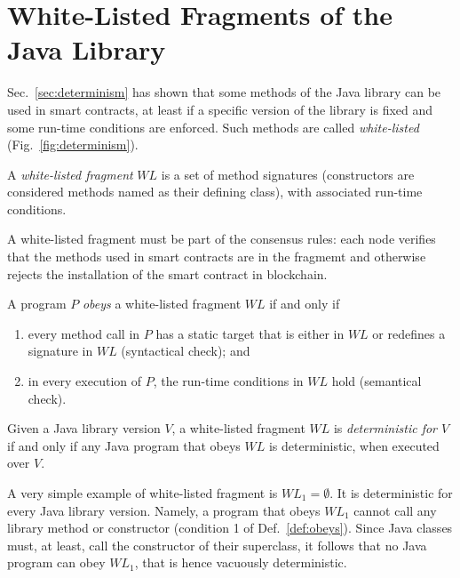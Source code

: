 \section{White-Listed Fragments of the Java Library}\label{sec:white_listing}

\newcommand{\wl}{\mathit{WL}}

Sec.~\ref{sec:determinism} has shown that some methods of the Java library can be used
in smart contracts, at least if a specific version of the library is fixed and some
run-time conditions are enforced. Such methods are called \emph{white-listed}
(Fig.~\ref{fig:determinism}).

\begin{definition}\label{def:white-listing}
  A \emph{white-listed fragment} $\wl$ is a set of method signatures (constructors are considered
  methods named as their defining class), with associated run-time conditions.
\end{definition}
%
A white-listed fragment must be part of the
consensus rules: each node verifies that the methods used in smart contracts are
in the fragmemt and otherwise rejects the installation of the smart contract
in blockchain.
%
\begin{definition}\label{def:obeys}
  A program $P$ \emph{obeys} a white-listed fragment $\wl$ if and only if
  \begin{enumerate}
    \item every method call
      in $P$ has a static target that is either in $\wl$ or redefines a signature in $\wl$
      (syntactical check); and
    \item in every execution of $P$, the run-time conditions in $\wl$ hold (semantical check).
  \end{enumerate}
\end{definition}
%
\begin{definition}\label{def:deterministic}
  Given a Java library version $V$, a white-listed fragment $\wl$ is
  \emph{deterministic for $V$}
  if and only if any Java program that obeys $\wl$
  is deterministic, when executed over $V$.
\end{definition}

A very simple example of white-listed fragment is
$\wl_1=\emptyset$. It is deterministic for every Java library version.
Namely, a program that obeys $\wl_1$ cannot call any library method or constructor
(condition 1 of Def.~\ref{def:obeys}).
Since Java classes must, at least, call the constructor of their superclass, it follows
that no Java program can obey $\wl_1$, that is hence vacuously deterministic.

